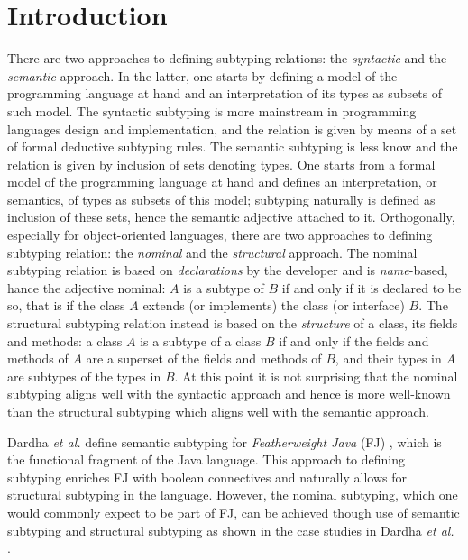\documentclass[runningheads]{llncs}
\begin{document}
\section{Introduction}
There are two approaches to defining subtyping relations: the \emph{syntactic} and the \emph{semantic} approach.
In the latter, one starts by defining a model of the programming language at hand and an interpretation of its types as subsets of such model.
The syntactic subtyping is more mainstream in programming languages design and implementation, and the relation is given by means of a set of formal deductive subtyping rules.
The semantic subtyping is less know and the relation is given by inclusion of sets denoting types. One starts from a formal model of the programming language at hand and defines an interpretation, or semantics, of types as subsets of this model; subtyping naturally is defined as inclusion of these sets, hence the semantic adjective attached to it.
Orthogonally, especially for object-oriented languages, there are two approaches to defining subtyping relation: the \emph{nominal} and the \emph{structural} approach.
The nominal subtyping relation is based on \emph{declarations} by the developer and is \emph{name}-based, hance the adjective nominal: $A$ is a subtype of $B$ if and only if it is declared to be so, that is if the class $A$ extends (or implements) the class (or interface) $B$.
The structural subtyping relation instead is based on the \emph{structure} of a class, its fields and methods: a class $A$ is a subtype of a class $B$ if and only if the fields and methods of $A$ are a superset of the fields and methods of $B$, and their types in $A$ are subtypes of the types in $B$.
At this point it is not surprising that the nominal subtyping aligns well with the syntactic approach and hence is more well-known than the structural subtyping which aligns well with the semantic approach.

Dardha \emph{et al.} \cite{Dardha2013,Dardha2017} define semantic subtyping for \emph{Featherweight Java} (FJ) \cite{featherweight}, which is the functional fragment of the Java language.
This approach to defining subtyping enriches FJ with boolean connectives and naturally allows for structural subtyping in the language.
However, the nominal subtyping, which one would  commonly expect to be part of FJ, can be achieved though use of semantic subtyping and structural subtyping as shown in the case studies in Dardha \emph{et al.} \cite[\S 8.4]{Dardha2017}.
\end{document}
